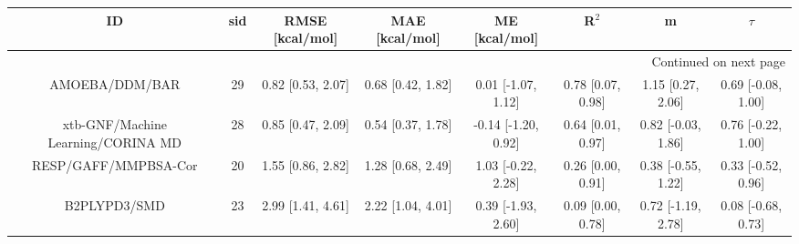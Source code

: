 \documentclass[8pt]{article}
\begin{document}
\begin{center}
\begin{footnotesize}
\begin{longtable}{|cccccccc|}
\toprule
                                 ID & sid &    RMSE [kcal/mol] &     MAE [kcal/mol] &        ME [kcal/mol] &              R$^2$ &                   m &              $\tau$ \\
\midrule
\endhead
\midrule
\multicolumn{8}{r}{{Continued on next page}} \\
\midrule
\endfoot

\bottomrule
\endlastfoot
                     AMOEBA/DDM/BAR &  29 &  0.82 [0.53, 2.07] &  0.68 [0.42, 1.82] &   0.01 [-1.07, 1.12] &  0.78 [0.07, 0.98] &   1.15 [0.27, 2.06] &  0.69 [-0.08, 1.00] \\
 xtb-GNF/Machine Learning/CORINA MD &  28 &  0.85 [0.47, 2.09] &  0.54 [0.37, 1.78] &  -0.14 [-1.20, 0.92] &  0.64 [0.01, 0.97] &  0.82 [-0.03, 1.86] &  0.76 [-0.22, 1.00] \\
               RESP/GAFF/MMPBSA-Cor &  20 &  1.55 [0.86, 2.82] &  1.28 [0.68, 2.49] &   1.03 [-0.22, 2.28] &  0.26 [0.00, 0.91] &  0.38 [-0.55, 1.22] &  0.33 [-0.52, 0.96] \\
                       B2PLYPD3/SMD &  23 &  2.99 [1.41, 4.61] &  2.22 [1.04, 4.01] &   0.39 [-1.93, 2.60] &  0.09 [0.00, 0.78] &  0.72 [-1.19, 2.78] &  0.08 [-0.68, 0.73] \\
\end{longtable}
\end{footnotesize}
\end{center}
\end{document}

